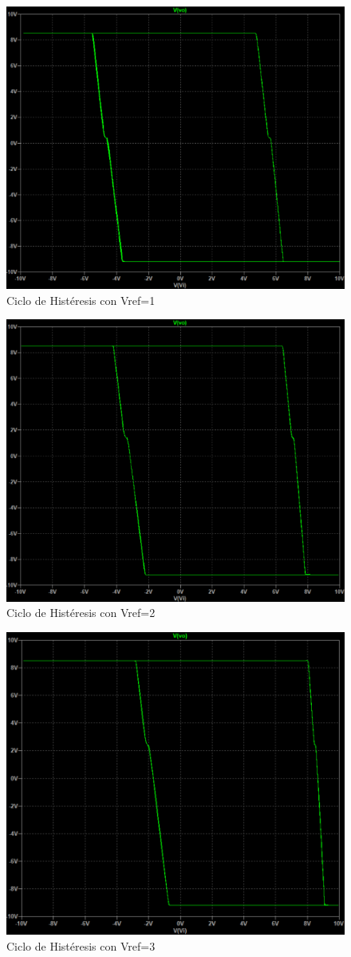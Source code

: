 \begin{figure}[H]
    \centering
    \includegraphics[width=0.75\linewidth]{Secciones/Circuito4/Circuito 4 - Vref1.png}
    \caption{Ciclo de Histéresis con Vref=1}
    \label{fig:Vref1}
\end{figure}
\begin{figure}[H]
    \centering
    \includegraphics[width=0.75\linewidth]{Secciones/Circuito4/Circuito 4 - Vref2.png}
    \caption{Ciclo de Histéresis con Vref=2}
    \label{fig:Vref2}
\end{figure}
\begin{figure}[H]
    \centering
    \includegraphics[width=0.75\linewidth]{Secciones/Circuito4/Circuito 4 - Vref3.png}
    \caption{Ciclo de Histéresis con Vref=3}
    \label{fig:Vref3}
\end{figure}

